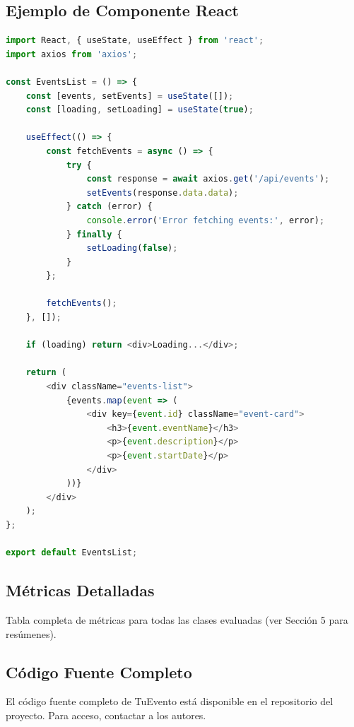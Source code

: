 \subsection{Ejemplo de Componente React}
\begin{lstlisting}[language=JavaScript, caption=Componente de Lista de Eventos en React]
import React, { useState, useEffect } from 'react';
import axios from 'axios';

const EventsList = () => {
    const [events, setEvents] = useState([]);
    const [loading, setLoading] = useState(true);

    useEffect(() => {
        const fetchEvents = async () => {
            try {
                const response = await axios.get('/api/events');
                setEvents(response.data.data);
            } catch (error) {
                console.error('Error fetching events:', error);
            } finally {
                setLoading(false);
            }
        };

        fetchEvents();
    }, []);

    if (loading) return <div>Loading...</div>;

    return (
        <div className="events-list">
            {events.map(event => (
                <div key={event.id} className="event-card">
                    <h3>{event.eventName}</h3>
                    <p>{event.description}</p>
                    <p>{event.startDate}</p>
                </div>
            ))}
        </div>
    );
};

export default EventsList;
\end{lstlisting}

\subsection{Métricas Detalladas}
Tabla completa de métricas para todas las clases evaluadas (ver Sección 5 para resúmenes).

\subsection{Código Fuente Completo}
El código fuente completo de TuEvento está disponible en el repositorio del proyecto. Para acceso, contactar a los autores.